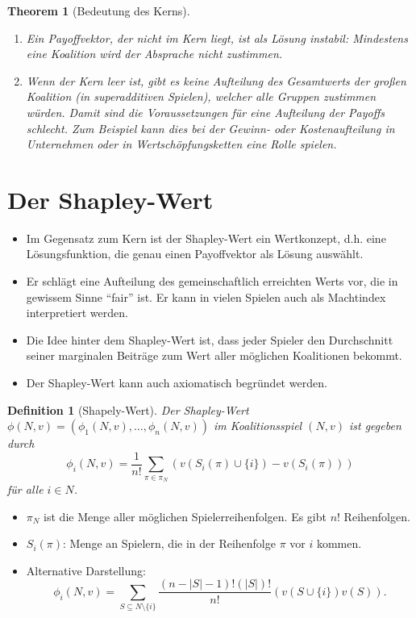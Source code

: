 \documentclass[12pt]{extreport} %
\theoremstyle{named}
\newtheorem{unnamedtheorem}{Theorem} \counterwithin{unnamedtheorem}{chapter}
\theoremstyle{itshape}
\newtheorem*{definition}{Definition}
\theoremstyle{normal}
\begin{document}
\begin{unnamedtheorem}[Bedeutung des Kerns] ~\
	\begin{enumerate}
		\item Ein Payoffvektor, der nicht im Kern liegt, ist als Lösung instabil: Mindestens eine Koalition wird der Absprache nicht zustimmen.
		\item Wenn der Kern leer ist, gibt es keine Aufteilung des Gesamtwerts der großen Koalition (in superadditiven Spielen), welcher alle Gruppen zustimmen würden. Damit sind die Voraussetzungen für eine Aufteilung der Payoffs schlecht. Zum Beispiel kann dies bei der Gewinn- oder Kostenaufteilung in Unternehmen oder in Wertschöpfungsketten eine Rolle spielen.
	\end{enumerate} 
\end{unnamedtheorem}

\section{Der Shapley-Wert}

\begin{itemize}
	\item Im Gegensatz zum Kern ist der Shapley-Wert ein Wertkonzept, d.h. eine Lösungsfunktion, die genau einen Payoffvektor als Lösung auswählt.
	\item Er schlägt eine Aufteilung des gemeinschaftlich erreichten Werts vor, die in gewissem Sinne \enquote{fair} ist. Er kann in vielen Spielen auch als Machtindex interpretiert werden.
	\item Die Idee hinter dem Shapley-Wert ist, dass jeder Spieler den Durchschnitt seiner marginalen Beiträge zum Wert aller möglichen Koalitionen bekommt.
	\item Der Shapley-Wert kann auch axiomatisch begründet werden.
\end{itemize}

\begin{definition}[Shapely-Wert]
	Der Shapley-Wert $\phi(N, v) = \left( \phi_1(N,v), \dotsc, \phi_n(N,v) \right)$ im Koalitionsspiel $(N, v)$ ist gegeben durch
	$$ \phi_i(N,v) = \frac{1}{n!} \sum_{\pi \in \pi_N} \left( v\left(S_i(\pi) \cup \{ i \} \right) - v\left(S_i(\pi)\right) \right) $$
	für alle $i \in N$.
\end{definition}

\begin{itemize}
	\item $\pi_N$ ist die Menge aller möglichen Spielerreihenfolgen. Es gibt $n!$ Reihenfolgen.
	\item $S_i(\pi)$: Menge an Spielern, die in der Reihenfolge $\pi$ vor $i$ kommen.
	\item Alternative Darstellung:
		$$ \phi_i(N,v) = \sum_{S \subseteq N \setminus \{ i \}}\frac{\left( n - |S| - 1 \right)!\left(|S|\right)!}{n!} \left( v\left( S \cup \{i\} \right) v(S) \right). $$
\end{itemize}
\end{document}
